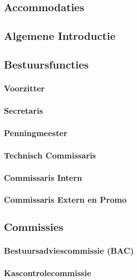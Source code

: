 \documentclass[]{article}
\begin{document}
\subsection{Accommodaties}

\subsection{Algemene Introductie}

\subsection{Bestuursfuncties}
\subsubsection{Voorzitter}

\subsubsection{Secretaris}

\subsubsection{Penningmeester}

\subsubsection{Technisch Commissaris}

\subsubsection{Commissaris Intern}

\subsubsection{Commissaris Extern en Promo}

\subsection{Commissies}
\subsubsection{Bestuursadviescommissie (BAC)}

\subsubsection{Kascontrolecommissie}
\end{document}
